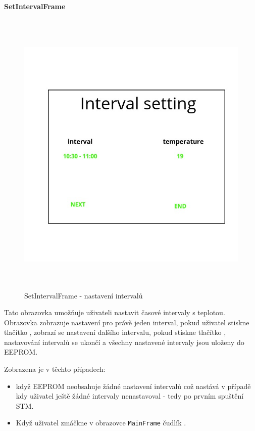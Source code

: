 \paragraph{SetIntervalFrame}
\begin{figure}[H]\centering
\includegraphics[width=140mm, height=140mm]{../img/interval_setting_frame.jpg}
\caption{SetIntervalFrame - nastavení intervalů}
\label{set-interval-frame}
\end{figure}

Tato obrazovka umožňuje uživateli nastavit časové intervaly s teplotou.
Obrazovka zobrazuje nastavení pro právě jeden interval, pokud uživatel stiskne tlačítko
, zobrazí se nastavení dalšího intervalu, pokud stiskne tlačítko , nastavování
intervalů se ukončí a všechny nastavené intervaly jsou uloženy do EEPROM.

Zobrazena je v těchto případech:
\begin{itemize}
  \item když EEPROM neobsahuje žádné nastavení intervalů což nastává v případě kdy uživatel
    ještě žádné intervaly nenastavoval - tedy po prvním spuštění STM.
  \item Když uživatel zmáčkne v obrazovce \texttt{MainFrame} čudlík .
\end{itemize}

